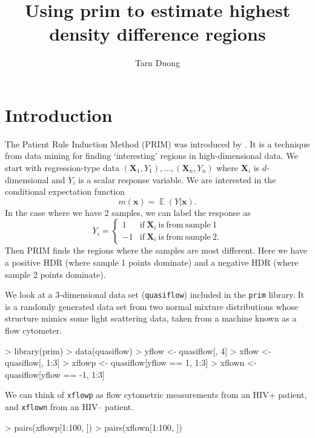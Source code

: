 \documentclass[a4paper,11pt]{article}
\title{Using prim to estimate highest density difference regions}
\author{Tarn Duong}
\renewcommand{\vec}[1]{\boldsymbol{#1}}
\DeclareMathOperator{\E}{\boldsymbol{\mathbb{E}}}
\def\vecx{\vec{x}}
\def\vecX{\vec{X}}
\begin{document}
\maketitle

\section{Introduction}

The Patient Rule Induction Method (PRIM) was introduced
by \citet*{friedman99}. It is a technique from data mining 
for finding `interesting' regions in high-dimensional data. 
We start with regression-type data $(\vecX_1, Y_1), \dots, (\vecX_n, Y_n)$
where $\vecX_i$ is $d$-dimensional and $Y_i$ is a scalar response variable.
We are interested in the conditional expectation function
$$
m(\vecx) = \E (Y | \vecx).    
$$
In the case where we have 2 samples, we can label the response as 
$$Y_i = \begin{cases} 1 & \mathrm{if} \ \vecX_i \ \mathrm{is \ from \ sample\ 1} \\
 -1 & \mathrm{if} \ \vecX_i \ \mathrm{is \ from \ sample\ 2.}
\end{cases}
$$
Then PRIM finds the regions where the samples are most different. 
Here we have a positive HDR (where sample 1 points dominate)
and a negative HDR (where sample 2 points dominate).

We look at a 3-dimensional data set (\texttt{quasiflow}) included in the
\texttt{prim} library. It is a randomly generated data set from 
two normal mixture distributions whose structure mimics  
some light scattering data, taken from a machine known as a flow cytometer. 
 
\begin{Schunk}
\begin{Sinput}
> library(prim)
> data(quasiflow)
> yflow <- quasiflow[, 4]
> xflow <- quasiflow[, 1:3]
> xflowp <- quasiflow[yflow == 1, 1:3]
> xflown <- quasiflow[yflow == -1, 1:3]
\end{Sinput}
\end{Schunk}
We can think of \texttt{xflowp} as flow cytometric measurements from an
HIV+ patient, and \texttt{xflown} from an HIV-- patient.
\begin{Schunk}
\begin{Sinput}
> pairs(xflowp[1:100, ])
> pairs(xflown[1:100, ])
\end{Sinput}
\end{Schunk}
\end{document}
